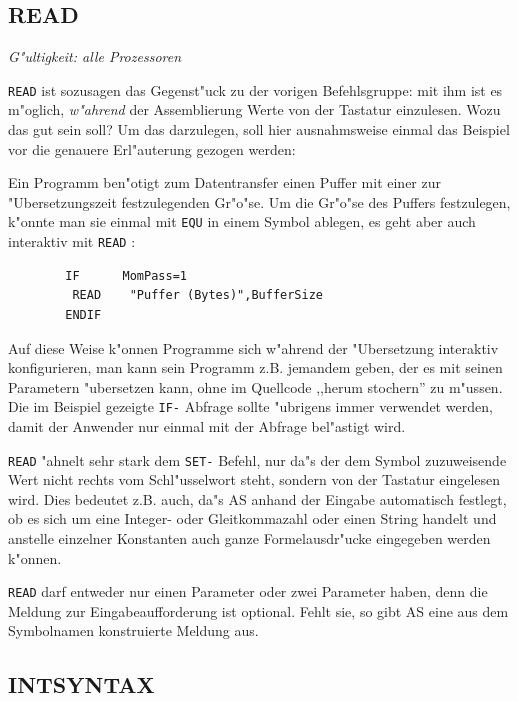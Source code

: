 \documentclass[12pt,a4paper,twoside]{report}
\makeatletter
\newcommand{\ii}[1]{{\it #1}}
\newcommand{\tty}[1]{{\tt #1}}
\newcommand{\ttindex}[1]{\index{#1@{\tt #1}}}
\newcommand{\asname}{AS}
\makeatother
\begin{document}

\subsection{READ}
\ttindex{READ}

{\em G"ultigkeit: alle Prozessoren}

\tty{READ} ist sozusagen das Gegenst"uck zu der vorigen Befehlsgruppe: mit
ihm ist es m"oglich, \ii{w"ahrend} der Assemblierung Werte von der
Tastatur einzulesen.  Wozu das gut sein soll?  Um das darzulegen, soll
hier ausnahmsweise einmal das Beispiel vor die genauere Erl"auterung
gezogen werden:
\par
Ein Programm ben"otigt zum Datentransfer einen Puffer mit einer zur
"Ubersetzungszeit festzulegenden Gr"o"se.  Um die Gr"o"se des Puffers
festzulegen, k"onnte man sie einmal mit \tty{EQU} in einem Symbol
ablegen, es geht aber auch interaktiv mit \tty{READ} :
\begin{verbatim}
        IF      MomPass=1
         READ    "Puffer (Bytes)",BufferSize
        ENDIF
\end{verbatim}
Auf diese Weise k"onnen Programme sich w"ahrend der "Ubersetzung
interaktiv konfigurieren, man kann sein Programm z.B. jemandem geben,
der es mit seinen Parametern "ubersetzen kann, ohne im Quellcode
,,herum stochern'' zu m"ussen.  Die im Beispiel gezeigte \tty{IF-}
Abfrage sollte "ubrigens immer verwendet werden, damit der Anwender
nur einmal mit der Abfrage bel"astigt wird.
\par
\tty{READ} "ahnelt sehr stark dem \tty{SET-} Befehl, nur da"s der
dem Symbol zuzuweisende Wert nicht rechts vom Schl"usselwort steht,
sondern von der Tastatur eingelesen wird.  Dies bedeutet z.B. auch,
da"s \asname{} anhand der Eingabe automatisch festlegt, ob es sich um eine
Integer- oder Gleitkommazahl oder einen String handelt und anstelle
einzelner Konstanten auch ganze Formelausdr"ucke eingegeben werden
k"onnen.
\par
\tty{READ} darf entweder nur einen Parameter oder zwei Parameter
haben, denn die Meldung zur Eingabeaufforderung ist optional.  Fehlt
sie, so gibt \asname{} eine aus dem Symbolnamen konstruierte Meldung aus.


\subsection{INTSYNTAX}
\label{SectINTSYNTAX}
\ttindex{INTSYNTAX}
\end{document}

